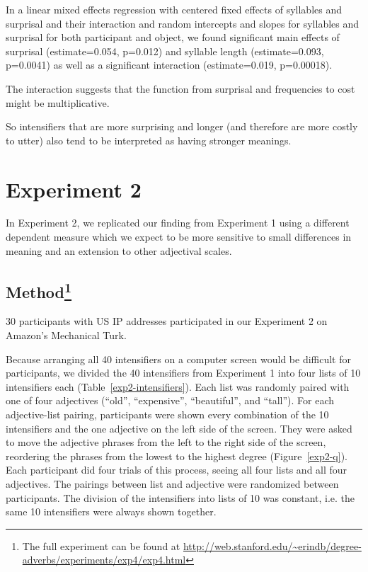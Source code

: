 \documentclass[10pt,letterpaper]{article}
\begin{document}
In a linear mixed effects regression with centered fixed effects of syllables and surprisal and their interaction and random intercepts and slopes for syllables and surprisal for both participant and object, we found significant main effects of surprisal (estimate=0.054, p=0.012) and syllable length  (estimate=0.093, p=0.0041) as well as a significant interaction (estimate=0.019, p=0.00018).

The interaction suggests that the function from surprisal and frequencies to cost might be multiplicative.

So intensifiers that are more surprising and longer (and therefore are more costly to utter) also tend to be interpreted as having stronger meanings.


\section{Experiment 2}

In Experiment 2, we replicated our finding from Experiment 1 using a different dependent measure which we expect to be more sensitive to small differences in meaning and an extension to other adjectival scales.

\subsection{Method\footnote{The full experiment can be found at \url{http://web.stanford.edu/~erindb/degree-adverbs/experiments/exp4/exp4.html}}}

30 participants with US IP addresses participated in our Experiment 2 on Amazon's Mechanical Turk.

Because arranging all 40 intensifiers on a computer screen would be difficult for participants, we divided the 40 intensifiers from Experiment 1 into four lists of 10 intensifiers each (Table~\ref{exp2-intensifiers}).
Each list was randomly paired with one of four adjectives (``old'', ``expensive'', ``beautiful'', and ``tall'').
For each adjective-list pairing, participants were shown every combination of the 10 intensifiers and the one adjective on the left side of the screen.
They were asked to move the adjective phrases from the left to the right side of the screen, reordering the phrases from the lowest to the highest degree (Figure~\ref{exp2-q}).
Each participant did four trials of this process, seeing all four lists and all four adjectives.
The pairings between list and adjective were randomized between participants.
The division of the intensifiers into lists of 10 was constant, i.e. the same 10 intensifiers were always shown together.
\end{document}
